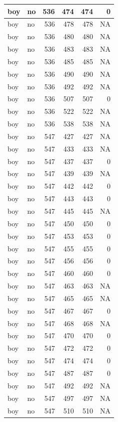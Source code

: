 \documentclass[man]{apa6}
\begin{document}
\begin{tabular}{l|l|r|r|r|r}
\hline
boy & no & 536 & 474 & 474 & 0\\
\hline
boy & no & 536 & 478 & 478 & NA\\
\hline
boy & no & 536 & 480 & 480 & NA\\
\hline
boy & no & 536 & 483 & 483 & NA\\
\hline
boy & no & 536 & 485 & 485 & NA\\
\hline
boy & no & 536 & 490 & 490 & NA\\
\hline
boy & no & 536 & 492 & 492 & NA\\
\hline
boy & no & 536 & 507 & 507 & 0\\
\hline
boy & no & 536 & 522 & 522 & NA\\
\hline
boy & no & 536 & 538 & 538 & NA\\
\hline
boy & no & 547 & 427 & 427 & NA\\
\hline
boy & no & 547 & 433 & 433 & NA\\
\hline
boy & no & 547 & 437 & 437 & 0\\
\hline
boy & no & 547 & 439 & 439 & NA\\
\hline
boy & no & 547 & 442 & 442 & 0\\
\hline
boy & no & 547 & 443 & 443 & 0\\
\hline
boy & no & 547 & 445 & 445 & NA\\
\hline
boy & no & 547 & 450 & 450 & 0\\
\hline
boy & no & 547 & 453 & 453 & 0\\
\hline
boy & no & 547 & 455 & 455 & 0\\
\hline
boy & no & 547 & 456 & 456 & 0\\
\hline
boy & no & 547 & 460 & 460 & 0\\
\hline
boy & no & 547 & 463 & 463 & NA\\
\hline
boy & no & 547 & 465 & 465 & NA\\
\hline
boy & no & 547 & 467 & 467 & 0\\
\hline
boy & no & 547 & 468 & 468 & NA\\
\hline
boy & no & 547 & 470 & 470 & 0\\
\hline
boy & no & 547 & 472 & 472 & 0\\
\hline
boy & no & 547 & 474 & 474 & 0\\
\hline
boy & no & 547 & 487 & 487 & 0\\
\hline
boy & no & 547 & 492 & 492 & NA\\
\hline
boy & no & 547 & 497 & 497 & NA\\
\hline
boy & no & 547 & 510 & 510 & NA\\

\end{tabular}
\end{document}
